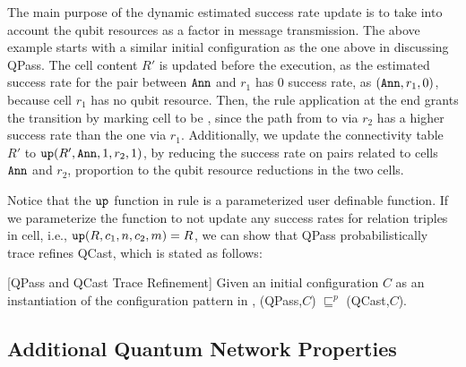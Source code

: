 The main purpose of the dynamic estimated success rate update is to take into account the qubit resources as a factor in message transmission. The above example starts with a similar initial configuration as the one above in discussing QPass. 
The  cell content $R'$ is updated before the execution, as the estimated success rate for the pair between $\texttt{Ann}$ and $r_1$ has $0$ success rate, as $(\texttt{Ann},r_1,0)$, because cell $r_1$ has no qubit resource. Then, the  rule application at the end grants the transition by marking cell  to be , since the path from  to  via $r_2$ has a higher success rate than the one via $r_1$. Additionally, we update the connectivity table $R'$ to $\texttt{up}(R',\texttt{Ann},1,r_2,1)$, by reducing the success rate on pairs related to cells $\texttt{Ann}$ and $r_2$, proportion to the qubit resource reductions in the two cells.

Notice that the $\texttt{up}$ function in rule  is a parameterized user definable function. 
If we parameterize the  function to not update any success rates for relation triples in  cell, i.e., $\texttt{up}(R,c_1,n,c_2,m)=R$, we can show that QPass probabilistically trace refines QCast, which is stated as follows:

\begin{theorem}\label{def:traceeq1}\rm[QPass and QCast Trace Refinement]
Given an initial configuration $C$ as an instantiation of the configuration pattern in , 
(QPass,$C$) $\sqsubseteq^p$ (QCast,$C$).

\end{theorem}

\subsection{Additional Quantum Network Properties}
\label{sec:add-prop}

